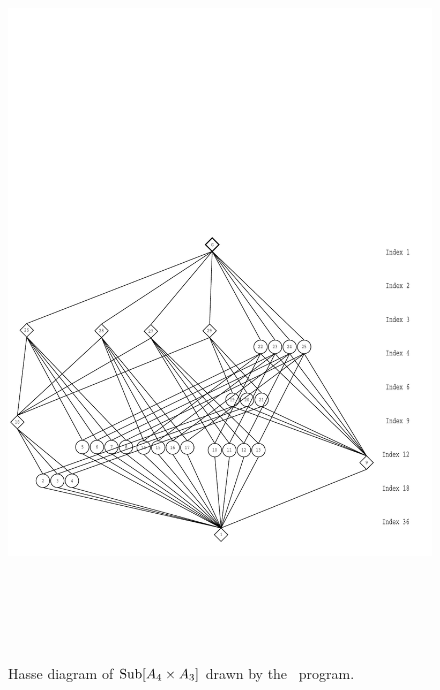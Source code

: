 \begin{enumerate}
{\begin{verbatim}
\end{verbatim}}
\begin{figure}[h!]\begin{center}
\vspace{-8cm}
\includegraphics[height=20cm]{inputs/a4a3new.pdf}%
\caption{Hasse diagram of $\mathrm{Sub}[A_4 \times A_3]$ drawn by the \xgap\ program.}
\label{fig:a4a3}
\end{center}\end{figure}
\begin{figure}[h!]\begin{center}
\vspace{-8cm}

\end{center}
\end{figure}
\end{enumerate}
